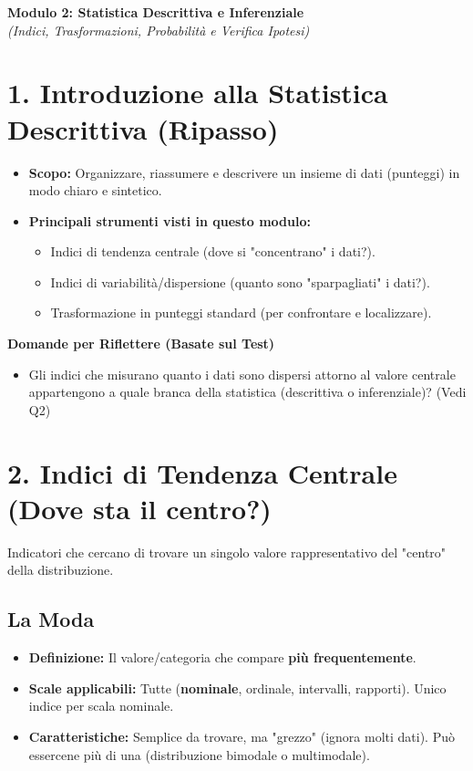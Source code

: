 \documentclass[12pt, a4paper]{article}
\newenvironment{reflectionbox}{%
    \medskip %
    \begin{framed}\par\noindent
    \textbf{\color{boxtitlecolor}Domande per Riflettere (Basate sul Test)} \par
    \begin{itemize}[leftmargin=*, label=$\blacktriangleright$]
}{%
    \end{itemize}\par
    \end{framed}
    \medskip %
}
\begin{document}
\begin{center}
    \Large\textbf{Modulo 2: Statistica Descrittiva e Inferenziale} \\
    \vspace{0.5cm}
    \large\textit{(Indici, Trasformazioni, Probabilità e Verifica Ipotesi)}
\end{center}

\section*{1. Introduzione alla Statistica Descrittiva (Ripasso)}
\begin{itemize}
    \item \textbf{Scopo:} Organizzare, riassumere e descrivere un insieme di dati (punteggi) in modo chiaro e sintetico.
    \item \textbf{Principali strumenti visti in questo modulo:}
        \begin{itemize}
            \item Indici di tendenza centrale (dove si "concentrano" i dati?).
            \item Indici di variabilità/dispersione (quanto sono "sparpagliati" i dati?).
            \item Trasformazione in punteggi standard (per confrontare e localizzare).
        \end{itemize}
\end{itemize}

\begin{reflectionbox}
    \item Gli indici che misurano quanto i dati sono dispersi attorno al valore centrale appartengono a quale branca della statistica (descrittiva o inferenziale)? (Vedi Q2)
\end{reflectionbox}

\section*{2. Indici di Tendenza Centrale (Dove sta il centro?)}
Indicatori che cercano di trovare un singolo valore rappresentativo del "centro" della distribuzione.

\subsection*{La Moda}
\begin{itemize}
    \item \textbf{Definizione:} Il valore/categoria che compare \textbf{più frequentemente}.
    \item \textbf{Scale applicabili:} Tutte (\textbf{nominale}, ordinale, intervalli, rapporti). Unico indice per scala nominale.
    \item \textbf{Caratteristiche:} Semplice da trovare, ma "grezzo" (ignora molti dati). Può essercene più di una (distribuzione bimodale o multimodale).
\end{itemize}
\end{document}
